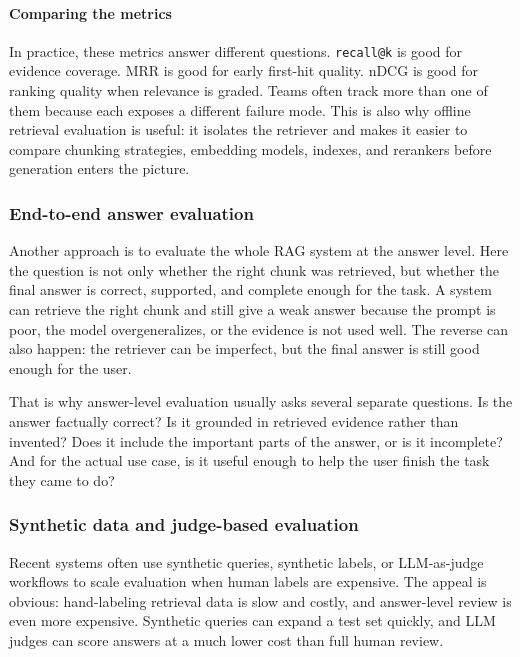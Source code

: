 \documentclass[12pt]{article}
\begin{document}
\paragraph{Comparing the metrics}

In practice, these metrics answer different questions. \texttt{recall@k}
is good for evidence coverage. MRR is good for early first-hit quality.
nDCG is good for ranking quality when relevance is graded. Teams often
track more than one of them because each exposes a different failure mode.
This is also why offline retrieval evaluation is useful: it isolates the
retriever and makes it easier to compare chunking strategies, embedding
models, indexes, and rerankers before generation enters the picture.

\subsubsection{End-to-end answer evaluation}

Another approach is to evaluate the whole RAG system at the answer level.
Here the question is not only whether the right chunk was retrieved, but
whether the final answer is correct, supported, and complete enough for
the task. A system can retrieve the right chunk and still give a weak
answer because the prompt is poor, the model overgeneralizes, or the
evidence is not used well. The reverse can also happen: the retriever can
be imperfect, but the final answer is still good enough for the user.

That is why answer-level evaluation usually asks several separate
questions. Is the answer factually correct? Is it grounded in retrieved
evidence rather than invented? Does it include the important parts of the
answer, or is it incomplete? And for the actual use case, is it useful
enough to help the user finish the task they came to do?

\subsubsection{Synthetic data and judge-based evaluation}

Recent systems often use synthetic queries, synthetic labels, or
LLM-as-judge workflows to scale evaluation when human labels are
expensive. The appeal is obvious: hand-labeling retrieval data is slow and
costly, and answer-level review is even more expensive. Synthetic queries
can expand a test set quickly, and LLM judges can score answers at a much
lower cost than full human review.
\end{document}
